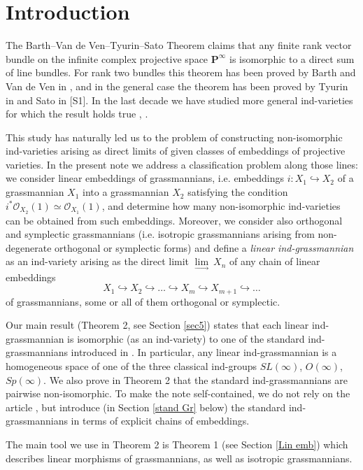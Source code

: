 \documentclass[12pt]{amsart}
\theoremstyle{definition}
\begin{document}
\section{Introduction}\label{sec1}
\label{Introduction}
The Barth--Van de Ven--Tyurin--Sato Theorem claims that any finite rank vector bundle on the infinite complex
projective space $\mathbf{P}^\infty$ is isomorphic to a direct sum  of line bundles. For rank two bundles this theorem
has been proved by Barth and Van de Ven in \cite{BV}, and in the general case the theorem has been proved by Tyurin in
\cite{T} and Sato in [S1]. In the last decade we have studied more general ind-varieties for which the result
holds true \cite{PT1}, \cite{PT2} \cite{DP}.

This study has naturally led us to the problem of constructing non-isomorphic ind-varieties arising as direct limits
of given classes of embeddings of projective varieties. In the present
note we address a classification problem along those lines:
we consider linear embeddings of grassmannians, i.e.
embeddings $i:X_1\hookrightarrow X_2$ of a grassmannian $X_1$ into a grassmannian $X_2$ satisfying the condition
$i^*\mathcal{O}_{X_2}(1)\simeq\mathcal{O}_{X_1}(1)$, and determine
how many non-isomorphic ind-varieties can be obtained from such embeddings. Moreover,
we consider also orthogonal and symplectic grassmannians (i.e. isotropic grassmannians arising from non-degenerate
orthogonal or
symplectic forms) and define a \textit{linear ind-grassmannian} as an ind-variety arising as the direct limit
$\underset{\longrightarrow}\lim\ X_n$ of any chain of linear embeddings
$$
X_1\hookrightarrow X_2\hookrightarrow\dots\hookrightarrow X_m \hookrightarrow X_{m+1}\hookrightarrow\dots
$$
of grassmannians, some or all of them orthogonal or symplectic.

Our main result (Theorem 2, see Section \ref{sec5}) states that each linear ind-grassmannian is isomorphic (as an
ind-variety) to one of the standard ind-grassmannians introduced in \cite{DiP}. In particular, any linear
ind-grassmannian is a homogeneous space
of one of the three classical ind-groups $SL(\infty)$, $O(\infty)$, $Sp(\infty)$. We also prove in Theorem 2 that the
standard ind-grassmannians are pairwise non-isomorphic. To make the note self-contained, we do not rely on the
article \cite{DiP}, but introduce (in Section \ref{stand Gr} below) the standard ind-grassmannians in terms of
explicit chains of embeddings.

The main tool we use in Theorem 2 is Theorem 1 (see Section \ref{Lin emb}) which describes linear morphisms of
grassmannians, as well as isotropic grassmannians.
\end{document}
